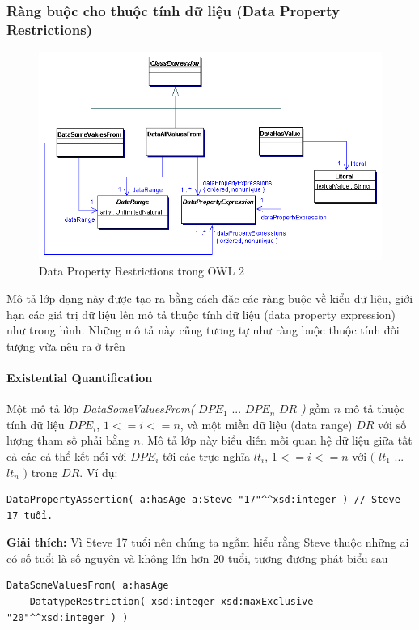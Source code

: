 \subsubsection{Ràng buộc cho thuộc tính dữ liệu (Data Property Restrictions)}
\begin{figure}[h]
	\centering
	\includegraphics[width=150mm]{Figures/ce_3.png}
	\caption{Data Property Restrictions trong OWL 2\label{overflow}}
\end{figure}
Mô tả lớp dạng này được tạo ra bằng cách đặc các ràng buộc về kiểu dữ liệu, giới hạn các giá trị dữ liệu lên mô tả thuộc tính dữ liệu (data property expression) như trong hình. Những mô tả này cũng tương tự như ràng buộc thuộc tính đối tượng vừa nêu ra ở trên

\paragraph{Existential Quantification} Một mô tả lớp \textit{DataSomeValuesFrom(} $DPE_{1}$ ... $DPE_{n}$ $DR$ \textit{)} gồm $n$ mô tả thuộc tính dữ liệu $DPE_{i}$, $1<=i<=n$, và một miền dữ liệu (data range) $DR$ với số lượng tham số phải bằng $n$. Mô tả lớp này biểu diễn mối quan hệ dữ liệu giữa tất cả các cá thể kết nối với $DPE_{i}$ tới các trực nghĩa $lt_{i}$, $1<=i<=n$ với $($ $lt_{1}$ ... $lt_{n}$ $)$ trong $DR$. Ví dụ:
\begin{verbatim}
DataPropertyAssertion( a:hasAge a:Steve "17"^^xsd:integer ) // Steve 17 tuổi.
\end{verbatim}
\textbf{Giải thích:} Vì Steve 17 tuổi nên chúng ta ngầm hiểu rằng Steve thuộc những ai có số tuổi là số nguyên và không lớn hơn 20 tuổi, tương đương phát biểu sau
\begin{verbatim}
DataSomeValuesFrom( a:hasAge 
    DatatypeRestriction( xsd:integer xsd:maxExclusive "20"^^xsd:integer ) )
\end{verbatim}

